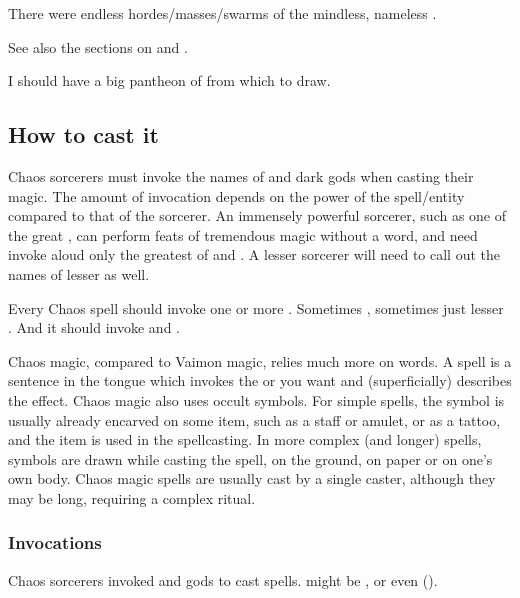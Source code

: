 There were endless hordes/masses/swarms of the mindless, nameless \daemons. 

See also the sections on  and . 

I should have a big pantheon of \daemons{} from which to draw. 







\subsection{How to cast it}
Chaos sorcerers must invoke the names of  and dark gods when casting their magic. The amount of invocation depends on the power of the spell/entity compared to that of the sorcerer. An immensely powerful sorcerer, such as one of the great \dragons, can perform feats of tremendous magic without a word, and need invoke aloud only the greatest of  and . A lesser sorcerer will need to call out the names of lesser \daemons{} as well. 

Every Chaos spell should invoke one or more \daemons{}. 
Sometimes \xss, sometimes just lesser \daemons. 
And it should invoke \Sethicus and \Tiamat. 

Chaos magic, compared to Vaimon magic, relies much more on words. 
A spell is a sentence in the \Draconic{} tongue which invokes the \daemon{} or \daemons{} you want and (superficially) describes the effect. 
Chaos magic also uses occult symbols. 
For simple spells, the symbol is usually already encarved on some item, such as a staff or amulet, or as a tattoo, and the item is used in the spellcasting. 
In more complex (and longer) spells, symbols are drawn while casting the spell, on the ground, on paper or on one's own body. 
Chaos magic spells are usually cast by a single caster, although they may be long, requiring a complex ritual. 




\subsubsection{Invocations}
Chaos sorcerers invoked  and gods to cast spells.
 might be , \dragons or even  (). 

